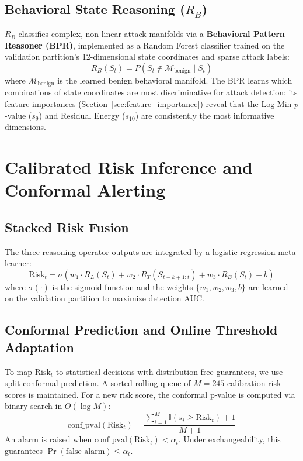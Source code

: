 \subsection{Behavioral State Reasoning ($R_B$)}

$R_B$ classifies complex, non-linear attack manifolds via a \textbf{Behavioral Pattern
Reasoner (BPR)}, implemented as a Random Forest classifier trained on the validation partition's
12-dimensional state coordinates and sparse attack labels:
\begin{equation}
R_B(S_t) = P(S_t \notin \mathcal{M}_{\text{benign}} \mid S_t)
\end{equation}
where $\mathcal{M}_{\text{benign}}$ is the learned benign behavioral manifold. The BPR learns
which combinations of state coordinates are most discriminative for attack detection; its feature
importances (Section~\ref{sec:feature_importance}) reveal that the Log Min $p$-value ($s_9$)
and Residual Energy ($s_{10}$) are consistently the most informative dimensions.


\section{Calibrated Risk Inference and Conformal Alerting}
\label{sec:calibration}

\subsection{Stacked Risk Fusion}

The three reasoning operator outputs are integrated by a logistic regression meta-learner:
\begin{equation}
\text{Risk}_t = \sigma\!\left(w_1 \cdot R_L(S_t) + w_2 \cdot R_T(S_{t-k+1:t}) + w_3 \cdot R_B(S_t) + b\right)
\end{equation}
where $\sigma(\cdot)$ is the sigmoid function and the weights $\{w_1, w_2, w_3, b\}$ are learned
on the validation partition to maximize detection AUC.

\subsection{Conformal Prediction and Online Threshold Adaptation}

To map $\text{Risk}_t$ to statistical decisions with distribution-free guarantees, we use split
conformal prediction. A sorted rolling queue of $M = 245$ calibration risk scores is maintained.
For a new risk score, the conformal p-value is computed via binary search in $O(\log M)$:
\begin{equation}
\text{conf\_pval}(\text{Risk}_t) = \frac{\sum_{i=1}^M \mathbb{I}(s_i \geq \text{Risk}_t) + 1}{M + 1}
\end{equation}
An alarm is raised when $\text{conf\_pval}(\text{Risk}_t) < \alpha_t$. Under exchangeability,
this guarantees $\Pr(\text{false alarm}) \leq \alpha_t$.


